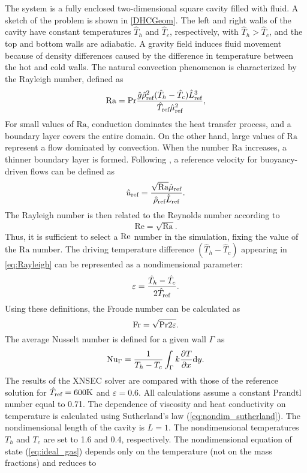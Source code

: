 The system is a fully enclosed two-dimensional square cavity filled with fluid.  A sketch of the problem is shown in \cref{DHCGeom}. The left and right walls of the cavity have constant temperatures $\hat{T}_h$ and $\hat{T}_c$, respectively, with $\hat{T}_h >\hat{T}_c$, and the top and bottom walls are adiabatic. A gravity field induces fluid movement because of density differences caused by the difference in temperature between the hot and cold walls.
The natural convection phenomenon is characterized by the Rayleigh number, defined as
\begin{equation}\label{eq:Rayleigh}
	\text{Ra} = \Prandtl \frac{\hat g \RefVal{\rho}^2(\hat T_h-\hat T_c) \RefVal{L}^3}{\RefVal{T}\RefVal{\mu}^2},
\end{equation}
For small values of $\text{Ra}$, conduction dominates the heat transfer process, and a boundary layer covers the entire domain. On the other hand, large values of $\text{Ra}$ represent a flow dominated by convection. When the number $\text{Ra}$ increases, a thinner boundary layer is formed.
Following \textcite{vierendeelsBenchmarkSolutionsNatural2003}, a reference velocity for buoyancy-driven flows can be defined as
\begin{equation}
	\RefVal{u} = \frac{\sqrt{\text{Ra}} \RefVal{\mu}}{\RefVal{\rho}\RefVal{L}}.
\end{equation}
The Rayleigh number is then related to the Reynolds number according to
\begin{equation}
	\text{Re} = \sqrt{\text{Ra}}.
\end{equation}
Thus, it is sufficient to select a $\Reynolds$ number in the simulation, fixing the value of the $\text{Ra}$ number. The driving temperature difference $(\hat T_h - \hat T_c)$ appearing in \cref{eq:Rayleigh} can be represented as a nondimensional parameter:
\begin{equation}\label{eq:nondimensionalTemperature}
	\varepsilon = \frac{\hat T_h - \hat T_c}{2\RefVal{T}}.
\end{equation}
Using these definitions, the Froude number can be calculated as
\begin{equation}
	\Froude = \sqrt{\Prandtl 2 \varepsilon}.
\end{equation}
The average Nusselt number is defined for a given wall $\Gamma$  as
\begin{equation}\label{eq:Nusselt}
	\text{Nu}_\Gamma = \frac{1}{T_h - T_c}\int_{\Gamma} k \pfrac{T}{x}\text{d}y.
\end{equation}
The results of the XNSEC solver are compared with those of the reference solution for $\RefVal{T} = 600\si{K}$ and $\varepsilon = 0.6$. All calculations assume a constant Prandtl number equal to 0.71. The dependence of viscosity and heat conductivity on temperature is calculated using Sutherland's law (\cref{eq:nondim_sutherland}). The nondimensional length of the cavity is $L=1$. The nondimensional temperatures $T_h$ and $T_c$ are set to 1.6 and 0.4, respectively. The nondimensional equation of state (\cref{eq:ideal_gas}) depends only on the temperature (not on the mass fractions) and reduces to
